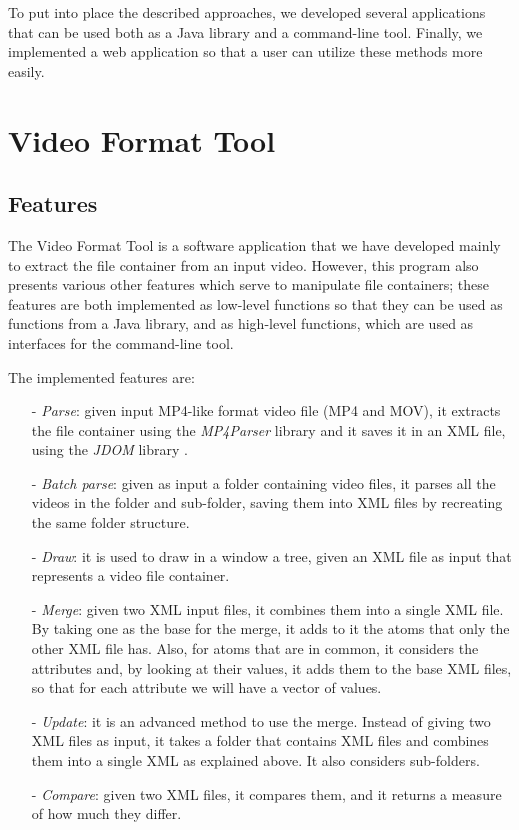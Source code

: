 To put into place the described approaches, we developed several applications that can be used both as a Java library and a command-line tool. Finally, we implemented a web application so that a user can utilize these methods more easily.

\section{Video Format Tool}

\subsection{Features}

The Video Format Tool is a software application that we have developed mainly to extract the file container from an input video. However, this program also presents various other features which serve to manipulate file containers; these features are both implemented as low-level functions so that they can be used as functions from a Java library, and as high-level functions, which are used as interfaces for the command-line tool.

The implemented features are:
\begin{itemize}
\item[-] \emph{Parse}: given input MP4-like format video file (MP4 and MOV), it extracts the file container using the \emph{MP4Parser} library \cite{mp4parser} and it saves it in an XML file, using the \emph{JDOM} library \cite{jdom}.
\item[-] \emph{Batch parse}: given as input a folder containing video files, it parses all the videos in the folder and sub-folder, saving them into XML files by recreating the same folder structure.
\item[-] \emph{Draw}: it is used to draw in a window a tree, given an XML file as input that represents a video file container.
\item[-] \emph{Merge}: given two XML input files, it combines them into a single XML file. By taking one as the base for the merge, it adds to it the atoms that only the other XML file has. Also, for atoms that are in common, it considers the attributes and, by looking at their values, it adds them to the base XML files, so that for each attribute we will have a vector of values.
\item[-] \emph{Update}: it is an advanced method to use the merge. Instead of giving two XML files as input, it takes a folder that contains XML files and combines them into a single XML as explained above. It also considers sub-folders.
\item[-] \emph{Compare}: given two XML files, it compares them, and it returns a measure of how much they differ.
\end{itemize}

